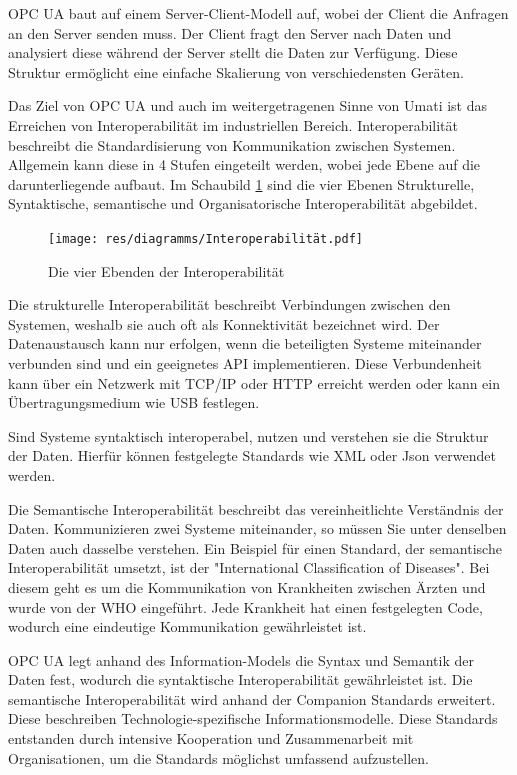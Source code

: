 \documentclass[a4paper, 12pt, oneside]{scrbook}
\begin{document}
	 OPC UA baut auf einem Server-Client-Modell auf, wobei der Client die Anfragen an den Server senden muss. Der Client fragt den Server nach Daten und analysiert diese während der Server stellt die Daten zur Verfügung. Diese Struktur ermöglicht eine einfache Skalierung von verschiedensten Geräten. 
	 
	 Das Ziel von OPC UA und auch im weitergetragenen Sinne von Umati ist das Erreichen von Interoperabilität im industriellen Bereich. Interoperabilität beschreibt die Standardisierung von Kommunikation zwischen Systemen. Allgemein kann diese in 4 Stufen eingeteilt werden, wobei jede Ebene auf die darunterliegende aufbaut. Im Schaubild \ref{fig:Interoperabilität} sind die vier Ebenen Strukturelle, Syntaktische, semantische und Organisatorische Interoperabilität abgebildet.
	 
	 \begin{figure}[H]
	 	\centering
	 	\texttt{[image: res/diagramms/Interoperabilität.pdf]}
	 	\caption{Die vier Ebenden der Interoperabilität}
	 	\label{fig:Interoperabilität}
	 \end{figure}
	 
	 Die strukturelle Interoperabilität beschreibt Verbindungen zwischen den Systemen, weshalb sie auch oft als Konnektivität bezeichnet wird. Der Datenaustausch kann nur erfolgen, wenn die beteiligten Systeme miteinander verbunden sind und ein geeignetes \ac{API} implementieren. Diese Verbundenheit kann über ein Netzwerk mit TCP/IP oder HTTP erreicht werden oder kann ein Übertragungsmedium wie USB festlegen. \cite{mielebacher_verteilte_2021}
	 
	 Sind Systeme syntaktisch interoperabel, nutzen und verstehen sie die Struktur der Daten. Hierfür können festgelegte Standards wie XML oder Json verwendet werden. \cite{mielebacher_verteilte_2021-1}
	 
	 Die Semantische Interoperabilität beschreibt das vereinheitlichte Verständnis der Daten. Kommunizieren zwei Systeme miteinander, so müssen Sie unter denselben Daten auch dasselbe verstehen. Ein Beispiel für einen Standard, der semantische Interoperabilität umsetzt, ist der "International Classification of Diseases". Bei diesem geht es um die Kommunikation von Krankheiten zwischen Ärzten und wurde von der WHO eingeführt. Jede Krankheit hat einen festgelegten Code, wodurch eine eindeutige Kommunikation gewährleistet ist. \cite{mielebacher_verteilte_2021-1}
	 
	 OPC UA legt anhand des Information-Models die Syntax und Semantik der Daten fest, wodurch die syntaktische Interoperabilität gewährleistet ist. Die semantische Interoperabilität wird anhand der Companion Standards erweitert. Diese beschreiben Technologie-spezifische Informationsmodelle. Diese Standards entstanden durch intensive Kooperation und Zusammenarbeit mit Organisationen, um die Standards möglichst umfassend aufzustellen. \cite{mielebacher_verteilte_2021-1}
	 
\end{document}
